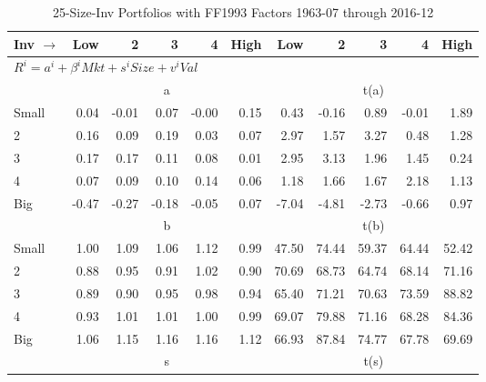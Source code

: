 
\begin{table}[!ht]
\centering
\caption{25-Size-Inv Portfolios with FF1993 Factors 1963-07 through 2016-12}
\begin{tabular}{lrrrrrrrrrr}
  \toprule
    Inv $\rightarrow$ & Low & 2 & 3 & 4 & High & Low & 2 & 3 & 4 & High \\ 
  \midrule
  \multicolumn{11}{l}{$R^i=a^i+\beta^iMkt+s^iSize+v^iVal$} \\

  
    
      & \multicolumn{5}{c}{a} & \multicolumn{5}{c}{t(a)}
    
    \\
      \cmidrule(r){2-6} \cmidrule(r){7-11}

    Small   & 0.04  & -0.01  & 0.07  & -0.00  & 0.15  & 0.43  & -0.16  & 0.89  & -0.01  & 1.89  \\
         2  & 0.16  & 0.09  & 0.19  & 0.03  & 0.07  & 2.97  & 1.57  & 3.27  & 0.48  & 1.28  \\
         3  & 0.17  & 0.17  & 0.11  & 0.08  & 0.01  & 2.95  & 3.13  & 1.96  & 1.45  & 0.24  \\
         4  & 0.07  & 0.09  & 0.10  & 0.14  & 0.06  & 1.18  & 1.66  & 1.67  & 2.18  & 1.13  \\
    Big     & -0.47  & -0.27  & -0.18  & -0.05  & 0.07  & -7.04  & -4.81  & -2.73  & -0.66  & 0.97  \\

  
    
      & \multicolumn{5}{c}{b} & \multicolumn{5}{c}{t(b)}
    
    \\
      \cmidrule(r){2-6} \cmidrule(r){7-11}

    Small   & 1.00  & 1.09  & 1.06  & 1.12  & 0.99  & 47.50  & 74.44  & 59.37  & 64.44  & 52.42  \\
         2  & 0.88  & 0.95  & 0.91  & 1.02  & 0.90  & 70.69  & 68.73  & 64.74  & 68.14  & 71.16  \\
         3  & 0.89  & 0.90  & 0.95  & 0.98  & 0.94  & 65.40  & 71.21  & 70.63  & 73.59  & 88.82  \\
         4  & 0.93  & 1.01  & 1.01  & 1.00  & 0.99  & 69.07  & 79.88  & 71.16  & 68.28  & 84.36  \\
    Big     & 1.06  & 1.15  & 1.16  & 1.16  & 1.12  & 66.93  & 87.84  & 74.77  & 67.78  & 69.69  \\

  
    
      & \multicolumn{5}{c}{s} & \multicolumn{5}{c}{t(s)}
    

\end{tabular}
\end{table}

